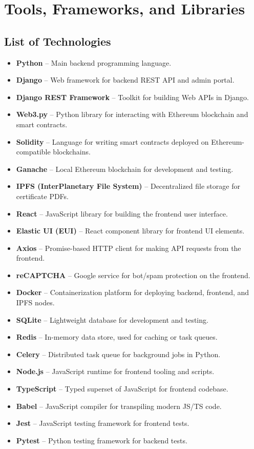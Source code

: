 \documentclass{article}
\begin{document}
\section{Tools, Frameworks, and Libraries}

\subsection{List of Technologies}
\begin{itemize}
    \item \textbf{Python} -- Main backend programming language.
    \item \textbf{Django} -- Web framework for backend REST API and admin portal.
    \item \textbf{Django REST Framework} -- Toolkit for building Web APIs in Django.
    \item \textbf{Web3.py} -- Python library for interacting with Ethereum blockchain and smart contracts.
    \item \textbf{Solidity} -- Language for writing smart contracts deployed on Ethereum-compatible blockchains.
    \item \textbf{Ganache} -- Local Ethereum blockchain for development and testing.
    \item \textbf{IPFS (InterPlanetary File System)} -- Decentralized file storage for certificate PDFs.
    \item \textbf{React} -- JavaScript library for building the frontend user interface.
    \item \textbf{Elastic UI (EUI)} -- React component library for frontend UI elements.
    \item \textbf{Axios} -- Promise-based HTTP client for making API requests from the frontend.
    \item \textbf{reCAPTCHA} -- Google service for bot/spam protection on the frontend.
    \item \textbf{Docker} -- Containerization platform for deploying backend, frontend, and IPFS nodes.
    \item \textbf{SQLite} -- Lightweight database for development and testing.
    \item \textbf{Redis} -- In-memory data store, used for caching or task queues.
    \item \textbf{Celery} -- Distributed task queue for background jobs in Python.
    \item \textbf{Node.js} -- JavaScript runtime for frontend tooling and scripts.
    \item \textbf{TypeScript} -- Typed superset of JavaScript for frontend codebase.
    \item \textbf{Babel} -- JavaScript compiler for transpiling modern JS/TS code.
    \item \textbf{Jest} -- JavaScript testing framework for frontend tests.
    \item \textbf{Pytest} -- Python testing framework for backend tests.
\end{itemize}
\end{document}
